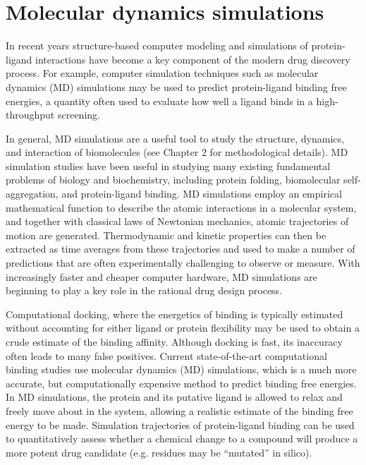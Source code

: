 \section{Molecular dynamics simulations}

In recent years structure-based computer modeling and simulations of protein-ligand interactions have become a key component of the modern drug discovery process. For example, computer simulation techniques such as molecular dynamics (MD) simulations may be used to predict protein-ligand binding free energies,  a quantity often used to evaluate how well a ligand binds in a high-throughput screening.

In general, MD simulations are a useful tool to study the structure, dynamics, and interaction of biomolecules (see Chapter 2 for methodological details).  MD simulation studies have been useful in studying many existing fundamental problems of biology and biochemistry, including protein folding, biomolecular self-aggregation, and protein-ligand binding.  MD simulations employ an empirical mathematical function to describe the atomic interactions in a molecular system, and together with classical laws of Newtonian mechanics, atomic trajectories of motion are generated.  Thermodynamic and kinetic properties can then be extracted as time averages from these trajectories and used to make a number of predictions that are often experimentally challenging to observe or measure.  With increasingly faster and cheaper computer hardware, MD simulations are beginning to play a key role in the rational drug design process. 

Computational docking, where the energetics of binding is typically estimated without accounting for either ligand or protein flexibility may be used to obtain a crude estimate of the binding affinity.  Although docking is fast, its inaccuracy often leads to many false positives.  Current state-of-the-art computational binding studies use molecular dynamics (MD) simulations, which is a much more accurate, but computationally expensive method to predict binding free energies.   In MD simulations, the protein and its putative ligand is allowed to relax and freely move about in the system, allowing a realistic estimate of the binding free energy to be made. Simulation trajectories of protein-ligand binding can be used to quantitatively assess whether a chemical change to a compound will produce a more potent drug candidate (e.g.  residues may be ``mutated'' in silico).


